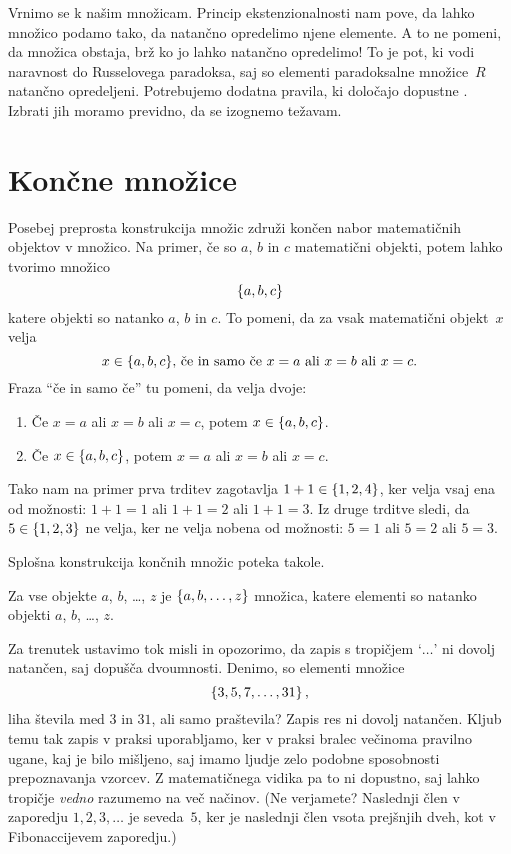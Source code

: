Vrnimo se k našim množicam. Princip ekstenzionalnosti nam pove, da lahko množico podamo
tako, da natančno opredelimo njene elemente. A to ne pomeni, da množica obstaja, brž ko jo
lahko natančno opredelimo! To je pot, ki vodi naravnost do Russelovega paradoksa, saj so
elementi paradoksalne množice~$R$ natančno opredeljeni. Potrebujemo dodatna pravila, ki
določajo dopustne . Izbrati jih moramo previdno, da se izognemo
težavam.

\section{Končne množice}
\label{sec:koncne-mnozice}

Posebej preprosta konstrukcija množic združi končen nabor matematičnih objektov v množico.
Na primer, če so $a$, $b$ in $c$ matematični objekti, potem lahko tvorimo množico
%
\begin{equation*}
  \set{a, b, c}
\end{equation*}
%
katere objekti so natanko $a$, $b$ in $c$. To pomeni, da za vsak matematični objekt~$x$
velja
%
\begin{equation*}
  \text{$x \in \set{a, b, c}$, če in samo če $x = a$ ali $x = b$ ali $x = c$.}
\end{equation*}
%
Fraza ``če in samo če'' tu pomeni, da velja dvoje:
%
\begin{enumerate}
\item Če $x = a$ ali $x = b$ ali $x = c$, potem $x \in \set{a, b, c}$.
\item Če $x \in \set{a, b, c}$, potem $x = a$ ali $x = b$ ali $x = c$.
\end{enumerate}
%
Tako nam na primer prva trditev zagotavlja $1+1 \in \set{1, 2, 4}$, ker velja
vsaj ena od možnosti: $1 + 1 = 1$ ali $1 + 1 = 2$ ali $1 + 1 = 3$. Iz druge trditve sledi, da
$5 \in \set{1, 2, 3}$ ne velja, ker ne velja nobena od možnosti: $5 = 1$ ali $5 = 2$ ali
$5 = 3$.

Splošna konstrukcija končnih množic poteka takole.

\begin{pravilo}
  \label{pravilo:koncna-mnozica}
  Za vse objekte $a$, $b$, \dots, $z$ je $\set{a, b, \ldots, z}$ množica, katere elementi
  so natanko objekti $a$, $b$, \dots, $z$.
\end{pravilo}

Za trenutek ustavimo tok misli in opozorimo, da zapis s tropičjem `$\ldots$' ni dovolj
natančen, saj dopušča dvoumnosti. Denimo, so elementi množice
%
\begin{equation*}
  \set{3, 5, 7, \ldots, 31},
\end{equation*}
%
liha števila med $3$ in $31$, ali samo praštevila? Zapis res ni dovolj natančen. Kljub
temu tak zapis v praksi uporabljamo, ker v praksi bralec večinoma pravilno ugane, kaj je
bilo mišljeno, saj imamo ljudje zelo podobne sposobnosti prepoznavanja vzorcev. Z
matematičnega vidika pa to ni dopustno, saj lahko tropičje \emph{vedno} razumemo na več
načinov. (Ne verjamete? Naslednji člen v zaporedju $1, 2, 3, \ldots$ je seveda~$5$, ker je
naslednji člen vsota prejšnjih dveh, kot v Fibonaccijevem zaporedju.)

